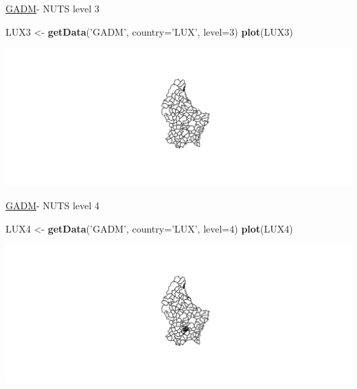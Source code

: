 \documentclass[ignorenonframetext,]{beamer}
\newenvironment{Shaded}{\begin{snugshade}}{\end{snugshade}}
\newcommand{\DataTypeTok}[1]{\textcolor[rgb]{0.13,0.29,0.53}{#1}}
\newcommand{\DecValTok}[1]{\textcolor[rgb]{0.00,0.00,0.81}{#1}}
\newcommand{\KeywordTok}[1]{\textcolor[rgb]{0.13,0.29,0.53}{\textbf{#1}}}
\newcommand{\NormalTok}[1]{#1}
\newcommand{\StringTok}[1]{\textcolor[rgb]{0.31,0.60,0.02}{#1}}
\begin{document}
\begin{frame}[fragile]{\href{http://www.gadm.org/}{GADM}- NUTS level 3}
\protect\hypertarget{gadm--nuts-level-3}{}

\begin{Shaded}
\begin{Highlighting}[]
\NormalTok{LUX3 <-}\StringTok{ }\KeywordTok{getData}\NormalTok{(}\StringTok{'GADM'}\NormalTok{, }\DataTypeTok{country=}\StringTok{'LUX'}\NormalTok{, }\DataTypeTok{level=}\DecValTok{3}\NormalTok{)}
\KeywordTok{plot}\NormalTok{(LUX3)}
\end{Highlighting}
\end{Shaded}

\includegraphics{A6_Shapefiles_files/figure-beamer/LUX3-1.pdf}

\end{frame}

\begin{frame}[fragile]{\href{http://www.gadm.org/}{GADM}- NUTS level 4}
\protect\hypertarget{gadm--nuts-level-4}{}

\begin{Shaded}
\begin{Highlighting}[]
\NormalTok{LUX4 <-}\StringTok{ }\KeywordTok{getData}\NormalTok{(}\StringTok{'GADM'}\NormalTok{, }\DataTypeTok{country=}\StringTok{'LUX'}\NormalTok{, }\DataTypeTok{level=}\DecValTok{4}\NormalTok{)}
\KeywordTok{plot}\NormalTok{(LUX4)}
\end{Highlighting}
\end{Shaded}

\includegraphics{A6_Shapefiles_files/figure-beamer/LUX4-1.pdf}

\end{frame}
\end{document}
